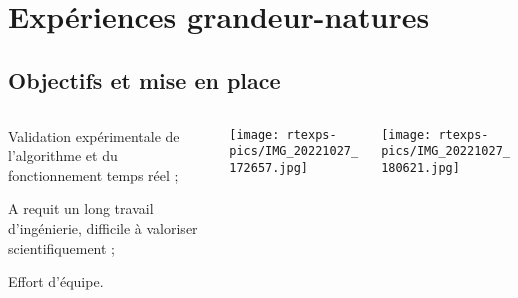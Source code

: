 \documentclass[../main.tex]{subfiles}
\begin{document}
\section{Expériences grandeur-natures}

\subsection{Objectifs et mise en place}

\begin{frame}{\subsecname}
  \begin{columns}
    \begin{column}{.5\linewidth}
      \centering
      \begin{ctrlitemize}{.5 em}
        \item Validation expérimentale de l'algorithme et du fonctionnement temps réel ;
        \item A requit un long travail d'ingénierie, difficile à valoriser scientifiquement ;
        \item Effort d'équipe.
      \end{ctrlitemize}
    \end{column}
    \begin{column}{.5\linewidth}
      \begin{columns}
        \begin{column}{.5\linewidth}
          \centering
          \texttt{[image: rtexps-pics/IMG\_20221027\_172657.jpg]}
        \end{column}
        \begin{column}{.5\linewidth}
          \centering
          \texttt{[image: rtexps-pics/IMG\_20221027\_180621.jpg]}
        \end{column}
      \end{columns}
    \end{column}
  \end{columns}

  \vspace{1 em}


\end{frame}
\end{document}
